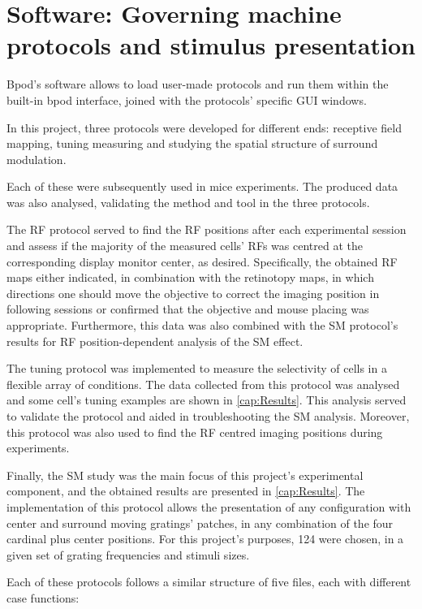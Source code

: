 \section{Software: Governing machine protocols and stimulus presentation}
\label{sec:sectionc}

Bpod's software allows to load user-made protocols and run them within the built-in bpod interface, joined with the protocols' specific GUI windows.

In this project, three protocols were developed for different ends: receptive field mapping, tuning measuring and studying the spatial structure of surround modulation.

Each of these were subsequently used in mice experiments. The produced data was also analysed, validating the method and tool in the three protocols. 

The RF protocol served to find the RF positions after each experimental session and assess if the majority of the measured cells' RFs was centred at the corresponding display monitor center, as desired. Specifically, the obtained RF maps either indicated, in combination with the retinotopy maps, in which directions one should move the objective to correct the imaging position in following sessions or confirmed that the objective and mouse placing was appropriate. Furthermore, this data was also combined with the SM protocol's results for RF position-dependent analysis of the SM effect.

The tuning protocol was implemented to measure the selectivity of cells in a flexible array of conditions. The data collected from this protocol was analysed and some cell's tuning examples are shown in \ref{cap:Results}. This analysis served to validate the protocol and aided in troubleshooting the SM analysis. Moreover, this protocol was also used to find the RF centred imaging positions during experiments. 

Finally, the SM study was the main focus of this project's experimental component, and the obtained results are presented in \ref{cap:Results}. The implementation of this protocol allows the presentation of any configuration with center and surround moving gratings' patches, in any combination of the four cardinal plus center positions. For this project's purposes, 124 were chosen, in a given set of grating frequencies and stimuli sizes.

Each of these protocols follows a similar structure of five files, each with different case functions:

